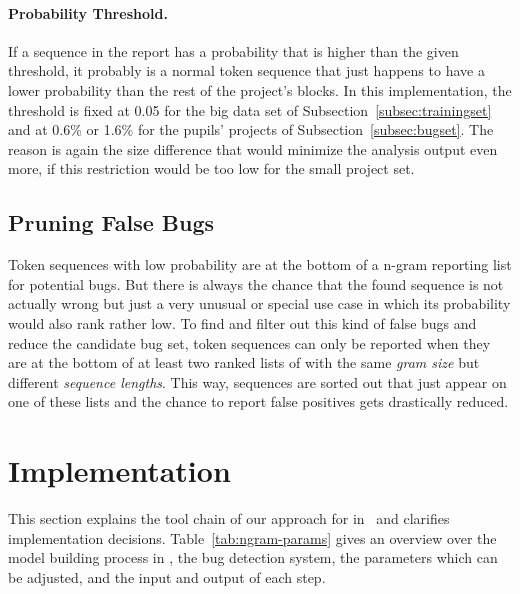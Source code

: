 \paragraph{Probability Threshold.}
If a sequence in the report has a probability that is higher than the given threshold, it probably is a normal token sequence that just happens to have a lower probability than the rest of the project's blocks. In this implementation, the threshold is fixed at 0.05 for the big data set of Subsection~\ref{subsec:trainingset} and at 0.6\% or 1.6\% for the pupils' projects of Subsection~\ref{subsec:bugset}. The reason is again the size difference that would minimize the analysis output even more, if this restriction would be too low for the small project set.

\subsection{Pruning False Bugs}\label{subsec:false_bugs}
Token sequences with low probability are at the bottom of a n-gram reporting list for potential bugs. But there is always the chance that the found sequence is not actually wrong but just a very unusual or special use case in which its probability would also rank rather low. To find and filter out this kind of false bugs and reduce the candidate bug set, token sequences can only be reported when they are at the bottom of at least two ranked lists of  with the same \textit{gram size} but different \textit{sequence lengths}. This way, sequences are sorted out that just appear on one of these lists and the chance to report false positives gets drastically reduced. 


\section{Implementation}\label{sec:implementation}
This section explains the tool chain of our approach for \ngram{} in \scratch\ and clarifies implementation
decisions. Table~\ref{tab:ngram-params} gives an overview over the model building process in \scratch, the bug detection system, the parameters which can be adjusted, and the input and output of each step.

